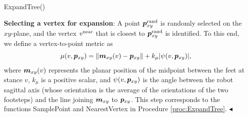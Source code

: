 \begin{procedure}%
	\small
	\removelatexerror
	
	\caption{ExpandTree()}
	\label{proc:ExpandTree}

	\vspace{2pt}
    \BlankLine
    
	 \Return{}\;
\end{procedure}

{\bf Selecting a vertex for expansion}: A point ${\bm{p}}_{xy}^{\rm rand}$ is randomly selected on the $xy$-plane, and
the vertex $v^{\rm near}$ that is closest to ${\bm{p}}_{xy}^{\rm rand}$ is identified. To this end, we define a vertex-to-point metric as
\begin{equation*}
\mu(v, {\bm{p}}_{xy}) = \lVert {\bm{m}}_{xy}(v) - {\bm{p}}_{xy} \rVert + k_{\mu} |\psi(v,{\bm{p}}_{xy})|,
\end{equation*}
where ${\bm{m}}_{xy}(v)$ represents the planar position of the midpoint between the feet at stance $v$, $k_{\mu}$ is a positive scalar, and $\psi(v,{\bm{p}}_{xy})$ is the angle between the robot sagittal axis (whose orientation is the average of the orientations of the two footsteps) and the line joining ${\bm{m}}_{xy}$ to ${\bm{p}}_{xy}$. 
This step corresponds to the functions SamplePoint and NearestVertex in Procedure \ref{proc:ExpandTree}.
\hfill $\blacktriangleleft$

